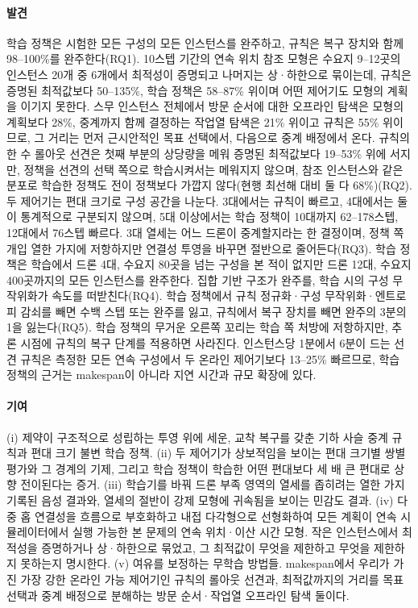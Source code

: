 \documentclass[final,5p,times,twocolumn]{elsarticle}
\begin{document}
\paragraph{발견}
학습 정책은 시험한 모든 구성의 모든 인스턴스를 완주하고, 규칙은 복구 장치와 함께
98--100\%를 완주한다(RQ1). 10스텝 기간의 연속 위치 참조 모형은 수요지 9--12곳의 인스턴스 20개
중 6개에서 최적성이 증명되고 나머지는 상·하한으로 묶이는데, 규칙은 증명된 최적값보다 50--135\%, 학습
정책은 58--87\% 위이며 어떤 제어기도 모형의 계획을 이기지 못한다. 스무 인스턴스 전체에서 방문 순서에
대한 오프라인 탐색은 모형의 계획보다 28\%, 중계까지 함께 결정하는 작업열 탐색은 21\% 위이고 규칙은
55\% 위이므로, 그 거리는 먼저 근시안적인 목표 선택에서, 다음으로 중계 배정에서 온다. 규칙의 한 수 롤아웃
선견은 첫째 부분의 상당량을 메워 증명된 최적값보다 19--53\% 위에 서지만, 정책을 선견의 선택 쪽으로
학습시켜서는 메워지지 않으며, 참조 인스턴스와 같은 분포로 학습한 정책도 전이 정책보다 가깝지 않다(현행 최선해 대비 둘 다 68\%)(RQ2). 두 제어기는 편대
크기로 구성 공간을 나눈다. 3대에서는 규칙이 빠르고, 4대에서는 둘이 통계적으로 구분되지
않으며, 5대 이상에서는 학습 정책이 10대까지 62--178스텝, 12대에서 76스텝 빠르다. 3대 열세는 어느
드론이 중계할지라는 한 결정이며, 정책 쪽 개입 열한 가지에 저항하지만 연결성 투영을 바꾸면 절반으로
줄어든다(RQ3). 학습 정책은 학습에서 드론 4대, 수요지 80곳을 넘는 구성을 본 적이 없지만 드론 12대,
수요지 400곳까지의 모든 인스턴스를 완주한다. 집합 기반 구조가 완주를, 학습 시의 구성 무작위화가
속도를 떠받친다(RQ4). 학습 정책에서 규칙 정규화·구성 무작위화·엔트로피 감쇠를 빼면 수백 스텝 또는
완주를 잃고, 규칙에서 복구 장치를 빼면 완주의 3분의 1을 잃는다(RQ5). 학습 정책의 무거운 오른쪽
꼬리는 학습 쪽 처방에 저항하지만, 추론 시점에 규칙의 복구 단계를 적용하면 사라진다. 인스턴스당
1분에서 6분이 드는 선견 규칙은 측정한 모든 연속 구성에서 두 온라인 제어기보다 13--25\% 빠르므로,
학습 정책의 근거는 makespan이 아니라 지연 시간과 규모 확장에 있다.

\paragraph{기여}
(i) 제약이 구조적으로 성립하는 투영 위에 세운, 교착 복구를 갖춘 기하 사슬 중계 규칙과 편대 크기
불변 학습 정책. (ii) 두 제어기가 상보적임을 보이는 편대 크기별 쌍별 평가와 그 경계의 기제, 그리고
학습 정책이 학습한 어떤 편대보다 세 배 큰 편대로 상향 전이된다는 증거. (iii) 학습기를 바꿔 드론
부족 영역의 열세를 좁히려는 열한 가지 기록된 음성 결과와, 열세의 절반이 강제 모형에 귀속됨을
보이는 민감도 결과. (iv) 다중 홉 연결성을 흐름으로 부호화하고 내접 다각형으로 선형화하여 모든 계획이
연속 시뮬레이터에서 실행 가능한 본 문제의 연속 위치·이산 시간 모형. 작은 인스턴스에서 최적성을
증명하거나 상·하한으로 묶었고, 그 최적값이 무엇을 제한하고 무엇을 제한하지 못하는지 명시한다.
(v) 여유를 보정하는 무학습 방법들. makespan에서 우리가 가진 가장 강한 온라인 가능 제어기인 규칙의
롤아웃 선견과, 최적값까지의 거리를 목표 선택과 중계 배정으로 분해하는 방문 순서·작업열 오프라인 탐색
둘이다.
\end{document}
